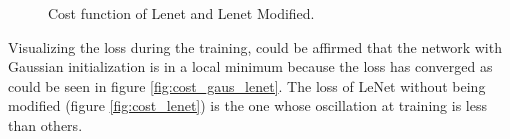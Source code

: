 \begin{figure}[htb]
    \caption{Cost function of Lenet and Lenet Modified.} \label{fig:CostModLeNet}
\end{figure}

Visualizing the loss during the training, could be affirmed that the network with Gaussian initialization is in a local minimum because the loss has converged as could be seen in figure \ref{fig:cost_gaus_lenet}. The loss of LeNet without being modified (figure  \ref{fig:cost_lenet}) is the one whose oscillation at training is less than others.\\\\

